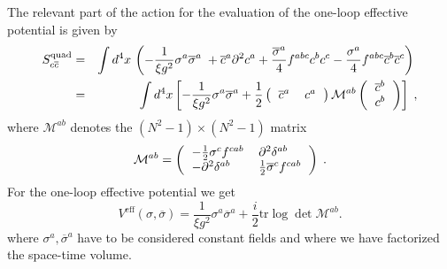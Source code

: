 \documentclass[a4paper,12pt]{article}
\begin{document}
The relevant part of the action for the evaluation of the one-loop effective
potential is given by 
\begin{eqnarray}
S_{c\overline{c}}^{\mathrm{quad}} &=&\int d^{4}x\,\left( -\frac{1}{\xi g^{2}}%
\sigma ^{a}\overline{\sigma }^{a}\;+\overline{c}^{a}\partial ^{2}c^{a}+\frac{%
\overline{\sigma }^{a}}{4}f^{abc}c^{b}c^{c}-\frac{\sigma ^{a}}{4}f^{abc}%
\overline{c}^{b}\overline{c}^{c}\right) \;  \nonumber \\
&=&\int d^{4}x\left[ -\frac{1}{\xi g^{2}}\sigma ^{a}\overline{\sigma }^{a}+%
\frac{1}{2}\left( 
\begin{tabular}{ll}
$\overline{c}^{a}$ & $c^{a}$%
\end{tabular}
\right) \mathcal{M}^{ab}\left( 
\begin{tabular}{l}
$\overline{c}^{b}$ \\ 
$c^{b}$%
\end{tabular}
\right) \right] \;,  \label{seffcf}
\end{eqnarray}
where $\mathcal{M}^{ab}$ denotes the $\left( N^{2}-1\right) \times \left(
N^{2}-1\right) $ matrix 
\begin{equation}
\mathcal{M}^{ab}=\left( 
\begin{tabular}{ll}
$-\frac{1}{2}\sigma ^{c}f^{cab}$ & $\partial ^{2}\delta ^{ab}$ \\ 
$-\partial ^{2}\delta ^{ab}$ & $\frac{1}{2}\overline{\sigma }^{c}f^{cab}$%
\end{tabular}
\right) \;.  \label{mabcf}
\end{equation}
For the one-loop effective potential we get 
\begin{equation}
V^{\mathrm{eff}}(\sigma ,\overline{\sigma })=\frac{1}{\xi g^{2}}\sigma ^{a}%
\overline{\sigma }^{a}+\frac{i}{2}\mathrm{tr\log \det }\mathcal{M}^{ab}.
\label{vsscf}
\end{equation}
where $\sigma ^{a},\overline{\sigma }^{a}$ have to be considered constant
fields and where we have factorized the space-time volume.
\end{document}
